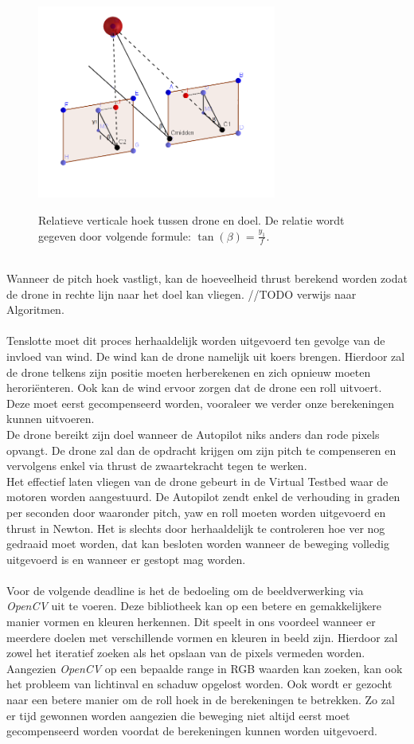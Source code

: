 \begin{figure}[h]
	\centering
	\includegraphics[width=0.7\textwidth]{RelatieveVerticaleHoek.png}
	\label{fig:RelatieveVerticaleHoek}
	\caption{Relatieve verticale hoek tussen drone en doel. De relatie wordt gegeven door volgende formule: \(\tan(\beta) = \frac{y_1}{f}\).}
\end{figure}
\\
Wanneer de pitch hoek vastligt, kan de hoeveelheid thrust berekend worden zodat de drone in rechte lijn naar het doel kan vliegen. //TODO verwijs naar Algoritmen.
\\
\\
Tenslotte moet dit proces herhaaldelijk worden uitgevoerd ten gevolge van de invloed van wind. De wind kan de drone namelijk uit koers brengen. Hierdoor zal de drone telkens zijn positie moeten herberekenen en zich opnieuw moeten herori\"enteren. Ook kan de wind ervoor zorgen dat de drone een roll uitvoert. Deze moet eerst gecompenseerd worden, vooraleer we verder onze berekeningen kunnen uitvoeren.
\\
De drone bereikt zijn doel wanneer de Autopilot niks anders dan rode pixels opvangt. De drone zal dan de opdracht krijgen om zijn pitch te compenseren en vervolgens enkel via thrust de zwaartekracht tegen te werken.
\\
Het effectief laten vliegen van de drone gebeurt in de Virtual Testbed waar de motoren worden aangestuurd. De Autopilot zendt enkel de verhouding in graden per seconden door waaronder pitch, yaw en roll moeten worden uitgevoerd en thrust in Newton. Het is slechts door herhaaldelijk te controleren hoe ver nog gedraaid moet worden, dat kan besloten worden wanneer de beweging volledig uitgevoerd is en wanneer er gestopt mag worden.
\\
\\
Voor de volgende deadline is het de bedoeling om de beeldverwerking via \textit{OpenCV} uit te voeren. Deze bibliotheek kan op een betere en gemakkelijkere manier vormen en kleuren herkennen. Dit speelt in ons voordeel wanneer er meerdere doelen met verschillende vormen en kleuren in beeld zijn. Hierdoor zal zowel het iteratief zoeken als het opslaan van de pixels vermeden worden. Aangezien \textit{OpenCV} op een bepaalde range in RGB waarden kan zoeken, kan ook het probleem van lichtinval en schaduw opgelost worden.
Ook wordt er gezocht naar een betere manier om de roll hoek in de berekeningen te betrekken. Zo zal er tijd gewonnen worden aangezien die beweging niet altijd eerst moet gecompenseerd worden voordat de berekeningen kunnen worden uitgevoerd. 